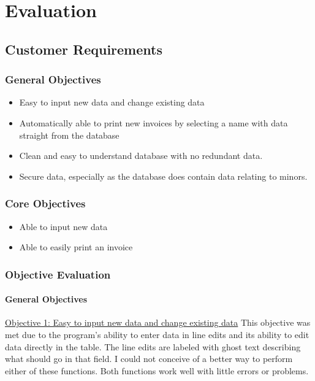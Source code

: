 \chapter{Evaluation}

\section{Customer Requirements}

\subsection{General Objectives}

\begin{itemize}
	\item Easy to input new data and change existing data
	\item Automatically able to print new invoices by selecting a name with data straight from the database
	\item Clean and easy to understand database with no redundant data.
	\item Secure data, especially as the database does contain data relating to minors.
\end{itemize}

\subsection{Core Objectives}
\begin{itemize}
	\item Able to input new data
	\item Able to easily print an invoice
\end{itemize}


\subsection{Objective Evaluation}

\subsubsection{General Objectives}
\underline{Objective 1: Easy to input new data and change existing data}
This objective was met due to the program's ability to enter data in line edits and its ability to edit data directly in the table. The line edits are labeled with ghost text describing what should go in that field. I could not conceive of a better way to perform either of these functions. Both functions work well with little errors or problems.

